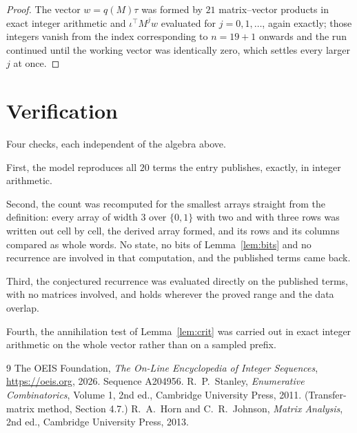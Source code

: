 \documentclass[11pt,a4paper]{article}
\theoremstyle{plain}
\theoremstyle{definition}
\begin{document}
\begin{proof}
The vector $w=q(M)\tau$ was formed by $21$ matrix--vector products in exact integer
arithmetic and $\iota^{\!\top}M^{j}w$ evaluated for $j=0,1,\dots$, again exactly; those
integers vanish from the index corresponding to $n=19+1$ onwards and the run continued
until the working vector was identically zero, which settles every larger $j$ at once.
\end{proof}

\section{Verification}

Four checks, each independent of the algebra above.

First, the model reproduces all $20$ terms the entry publishes, exactly, in integer
arithmetic.

Second, the count was recomputed for the smallest arrays straight from the definition: every
array of width $3$ over $\{0,1\}$ with two and with three rows was written out cell by cell,
the derived array formed, and its rows and its columns compared as whole words. No state, no
bits of Lemma~\ref{lem:bits} and no recurrence are involved in that computation, and the
published terms came back.

Third, the conjectured recurrence was evaluated directly on the published terms, with no
matrices involved, and holds wherever the proved range and the data overlap.

Fourth, the annihilation test of Lemma~\ref{lem:crit} was carried out in exact integer
arithmetic on the whole vector rather than on a sampled prefix.

\begin{thebibliography}{9}
 The OEIS Foundation, \emph{The On-Line Encyclopedia of Integer
Sequences}, \url{https://oeis.org}, 2026. Sequence A204956.
 R.~P.~Stanley, \emph{Enumerative Combinatorics}, Volume 1, 2nd ed.,
Cambridge University Press, 2011. (Transfer-matrix method, Section 4.7.)
 R.~A.~Horn and C.~R.~Johnson, \emph{Matrix Analysis}, 2nd ed., Cambridge
University Press, 2013.
\end{thebibliography}
\end{document}

